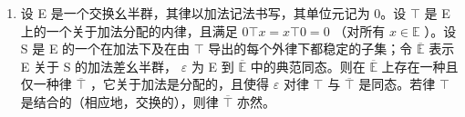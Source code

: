 \begin{enumerate}
\def\labelenumi{\arabic{enumi}.}
\setcounter{enumi}{9}
\tightlist
\item
  设 E 是一个交换幺半群，其律以加法记法书写，其单位元记为 0。设 \(\top\) 是 E 上的一个关于加法分配的内律，且满足 \(0 \top x = x \top 0 = 0\) （对所有 \(x \in \mathbb{E}\) ）。设 S 是 E 的一个在加法下及在由 \(\top\) 导出的每个外律下都稳定的子集；令 \(\overline{\mathbb{E}}\) 表示 E 关于 S 的加法差幺半群， \(\varepsilon\) 为 E 到 \(\overline{\mathbb{E}}\) 中的典范同态。则在 \(\overline{\mathbb{E}}\) 上存在一种且仅一种律 \(\overline{\top}\) ，它关于加法是分配的，且使得 \(\varepsilon\) 对律 \(\top\) 与 \(\overline{\top}\) 是同态。若律 \(\top\) 是结合的（相应地，交换的），则律 \(\overline{\top}\) 亦然。
\end{enumerate}


